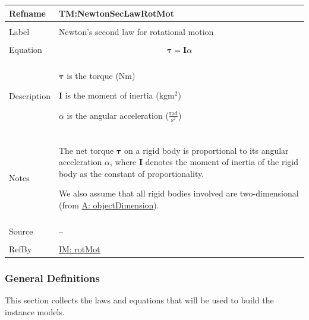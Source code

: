 \documentclass[12pt]{article}
\begin{document}
\vspace{\baselineskip}
\noindent
\begin{minipage}{\textwidth}
\begin{tabular}{>{\raggedright}p{}>{\raggedright\arraybackslash}p{}}
\toprule \textbf{Refname} & \textbf{TM:NewtonSecLawRotMot}
\label{TM:NewtonSecLawRotMot}
\\ \midrule \\
Label & Newton's second law for rotational motion
        
\\ \midrule \\
Equation & \begin{displaymath}
           \mathbf{τ}=\mathbf{I} α
           \end{displaymath}
\\ \midrule \\
Description & \begin{symbDescription}
              \item{$\mathbf{τ}$ is the torque ($\text{N}\text{m}$)}
              \item{$\mathbf{I}$ is the moment of inertia ($\text{kg}\text{m}^{2}$)}
              \item{$α$ is the angular acceleration ($\frac{\text{rad}}{\text{s}^{2}}$)}
              \end{symbDescription}
\\ \midrule \\
Notes & The net torque $\mathbf{τ}$ on a rigid body is proportional to its angular acceleration $α$, where $\mathbf{I}$ denotes the moment of inertia of the rigid body as the constant of proportionality.
        
        We also assume that all rigid bodies involved are two-dimensional (from \hyperref[assumpOD]{A: objectDimension}).
        
\\ \midrule \\
Source & --
         
\\ \midrule \\
RefBy & \hyperref[IM:rotMot]{IM: rotMot}
        
\\ \bottomrule
\end{tabular}
\end{minipage}
\subsubsection{General Definitions}
\label{Sec:GDs}
This section collects the laws and equations that will be used to build the instance models.
\end{document}

